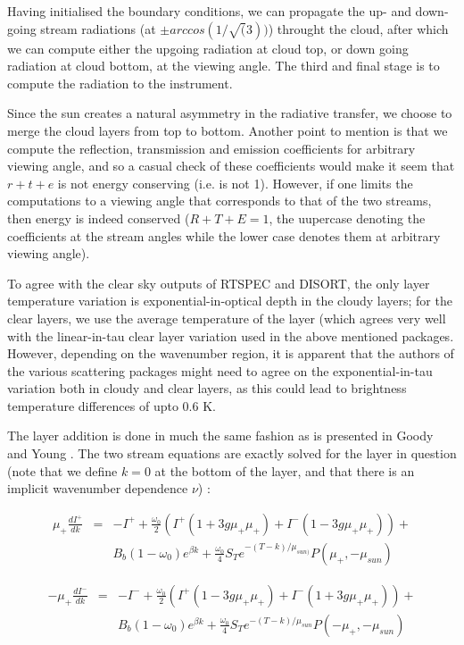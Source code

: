 \documentclass[12pt]{article}
\begin{document}
{{{{Having initialised the boundary conditions, we can propagate the up- and down-
going stream radiations (at $\pm arccos(1/\sqrt(3))$) throught the cloud, 
after which we can compute either the upgoing radiation at cloud top, or down 
going radiation at cloud bottom, at the viewing angle. The third and final 
stage is to compute the radiation to the instrument.

Since the sun creates a natural asymmetry in the radiative transfer, we 
choose to merge the cloud layers from top to bottom. Another point to mention 
is that we compute the reflection, transmission and emission coefficients for 
arbitrary viewing angle, and so a casual check of these coefficients would 
make it seem that $r+t+e$ is not energy conserving (i.e. is not 1). However, 
if one limits the computations to a viewing angle that corresponds to that of 
the two streams, then energy is indeed conserved ($R+T+E = 1$, the uupercase 
denoting the coefficients at the stream angles while the lower case denotes
them at arbitrary viewing angle). 

To agree with the clear sky outputs of \textsf{RTSPEC} and \textsf{DISORT}, 
the only layer temperature variation is exponential-in-optical depth in the 
cloudy layers; 
for the clear layers, we use the average temperature of the layer (which 
agrees very well with the linear-in-tau clear layer variation used in the 
above mentioned packages. However, depending on the wavenumber region, it is
apparent that the authors of the various scattering packages might need to 
agree on the exponential-in-tau variation both in cloudy and clear layers, as 
this could lead to brightness temperature differences of upto 0.6 K.

The layer addition is done in much the same fashion as is presented in Goody 
and Young \cite{goo:89}. The two stream equations are exactly solved for 
the layer in question (note that we define $k=0$ at the bottom of the 
layer, and that there is an implicit wavenumber dependence $\nu$) : 

\[
\begin{array}{ccc}
\mu_{+} \frac{dI^{+}}{dk} & = & -I^{+} + \frac{\omega_{0}}{2} 
(I^{+}(1 + 3g\mu_{+} \mu_{+}) + I^{-}(1 - 3g\mu_{+} \mu_{+})) + \\
                             & & B_{b}(1-\omega_{0})e^{\beta k} + 
\frac{\omega_{0}}{4}S_{T}e^{-(T-k)/\mu_{sun)}}P(\mu_{+},-\mu_{sun})
\end{array}
\]

\[
\begin{array}{ccc}
-\mu_{+} \frac{dI^{-}}{dk} & = & -I^{-} + \frac{\omega_{0}}{2} 
(I^{+}(1 - 3g\mu_{+} \mu_{+}) + I^{-}(1 + 3g\mu_{+} \mu_{+})) + \\
                            & & B_{b}(1-\omega_{0})e^{\beta k} + 
\frac{\omega_{0}}{4} S_{T} e^{-(T-k)/\mu_{sun}}P(-\mu_{+},-\mu_{sun})
\end{array}
\]

}}}}
\end{document}
